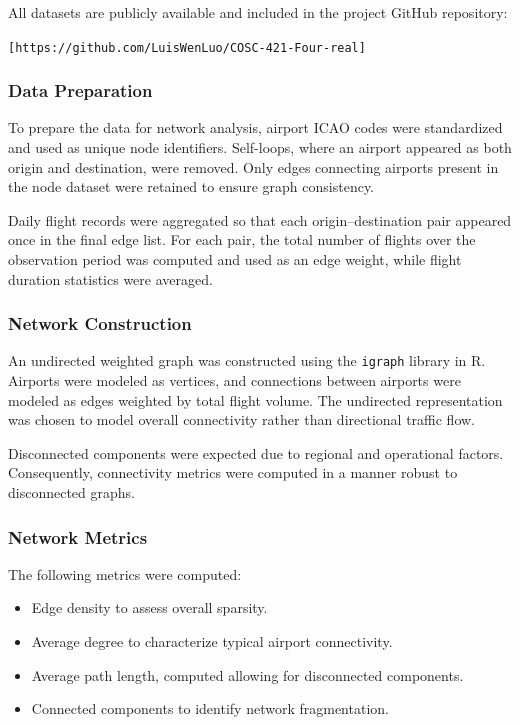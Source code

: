 \documentclass{article}
\begin{document}
All datasets are publicly available and included in the project GitHub repository:
\begin{center}
\texttt{[https://github.com/LuisWenLuo/COSC-421-Four-real]}
\end{center}

\subsubsection{Data Preparation}
To prepare the data for network analysis, airport ICAO codes were standardized and used as unique node identifiers. Self-loops, where an airport appeared as both origin and destination, were removed. Only edges connecting airports present in the node dataset were retained to ensure graph consistency.

Daily flight records were aggregated so that each origin–destination pair appeared once in the final edge list. For each pair, the total number of flights over the observation period was computed and used as an edge weight, while flight duration statistics were averaged.

\subsubsection{Network Construction}
An undirected weighted graph was constructed using the \texttt{igraph} library in R. Airports were modeled as vertices, and connections between airports were modeled as edges weighted by total flight volume. The undirected representation was chosen to model overall connectivity rather than directional traffic flow.

Disconnected components were expected due to regional and operational factors. Consequently, connectivity metrics were computed in a manner robust to disconnected graphs.

\subsubsection{Network Metrics}
The following metrics were computed:
\begin{itemize}
    \item Edge density to assess overall sparsity.
    \item Average degree to characterize typical airport connectivity.
    \item Average path length, computed allowing for disconnected components.
    \item Connected components to identify network fragmentation.
\end{itemize}
\end{document}
